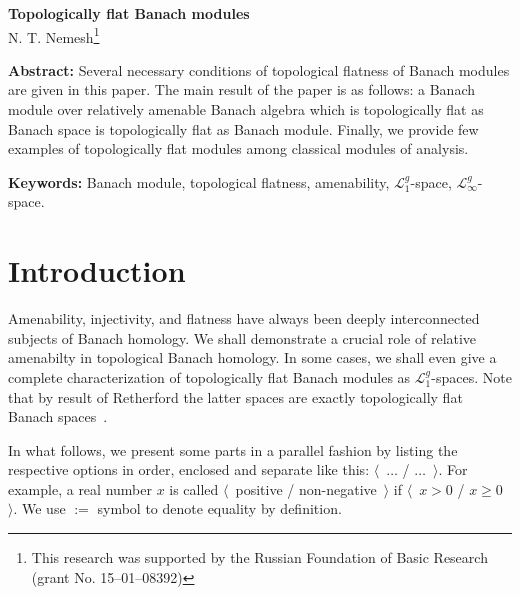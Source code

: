 \documentclass[12pt]{article}
\begin{document}
\begin{center}
\Large \textbf{Topologically flat Banach modules}\\[0.5cm]
\small {N. T. Nemesh}\footnote{This research was supported by the Russian
Foundation of Basic Research (grant No. 15--01--08392)}\\[0.5cm]
\end{center}

\thispagestyle{empty}

\medskip
\textbf{Abstract:} Several necessary conditions of topological flatness of
Banach modules are given in this paper. The main result of the paper is as
follows: a Banach module over relatively amenable Banach algebra which is
topologically flat as Banach space is topologically flat as Banach module.
Finally, we provide few examples of topologically flat modules among classical
modules of analysis.

\medskip
\textbf{Keywords:} Banach module, topological flatness, amenability,
$\mathcal{L}_1^g$-space, $\mathcal{L}_\infty^g$-space.

\bigskip


\section{Introduction}\label{SectionIntroduction}

Amenability, injectivity, and flatness have always been deeply interconnected
subjects of Banach homology. We shall demonstrate a crucial role of relative
amenabilty in topological Banach homology. In some cases, we shall even give a
complete characterization of topologically flat Banach modules as
$\mathcal{L}_1^g$-spaces. Note that by result of Retherford the latter spaces
are exactly topologically flat Banach spaces~\cite{StegRethNucOpL1LInfSp}.

In what follows, we present some parts in a parallel fashion by listing the
respective options in order, enclosed and separate like this: $\langle$~$\ldots$
/ $\ldots$~$\rangle$. For example, a real number $x$ is called
$\langle$~positive / non-negative~$\rangle$ if $\langle$~$x>0$ / $x\geq
0$~$\rangle$. We use $:=$ symbol to denote equality by definition.
\end{document}
